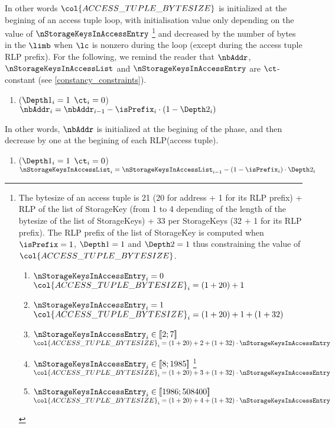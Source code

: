 In other words $\col{ACCESS\_TUPLE\_BYTESIZE}$ is initialized at the begining of an access tuple loop, with initialisation value only depending on the value of $\nStorageKeysInAccessEntry$ 
\footnote{The bytesize of an access tuple is 21 (20 for address + 1 for its RLP prefix) + RLP of the list of StorageKey (from 1 to 4 depending of the length of the bytesize of the list of StorageKeys) + 33 per StorageKeys (32 + 1 for its RLP prefix). The RLP prefix of the list of StorageKey is computed when $\isPrefix = 1$, $\Depth 1 =1$ and $\Depth 2 = 1$ thus constraining the value of $\col{ACCESS\_TUPLE\_BYTESIZE}$.
\begin{enumerate}
	\item \If $\nStorageKeysInAccessEntry_{i}=0$ \Then $\col{ACCESS\_TUPLE\_BYTESIZE}_{i}=(1+20) + 1$
	\item \If $\nStorageKeysInAccessEntry_{i}=1$ \Then $\col{ACCESS\_TUPLE\_BYTESIZE}_{i}=(1+20) + 1 + (1+32)$
	\item \If $\nStorageKeysInAccessEntry_{i} \in [\![ 2 ; 7 ]\!] $ \Then $\col{ACCESS\_TUPLE\_BYTESIZE}_{i}= (1+20) + 2 + (1+32) \cdot \nStorageKeysInAccessEntry$
	\item \If $\nStorageKeysInAccessEntry_{i} \in [\![ 8 ; 1985  ]\!]$ \footnote{In this case the bytesize of $\nStorageKeysInAccessEntry$ RLP(StorageKey) is a two bytes integer.} \Then $\col{ACCESS\_TUPLE\_BYTESIZE}_{i}= (1+20) + 3 + (1+32) \cdot \nStorageKeysInAccessEntry$
	\item \If $\nStorageKeysInAccessEntry_{i} \in [\![ 1986 ; 508400]\!]$ \Then $\col{ACCESS\_TUPLE\_BYTESIZE}_{i}= (1+20) + 4 + (1+32) \cdot \nStorageKeysInAccessEntry$
\end{enumerate}
}
and decreased by the number of bytes in the $\limb$ when $\lc$ is nonzero during the loop (except during the access tuple RLP prefix).
\newline
For the following, we remind the reader that $\nbAddr$, $\nStorageKeysInAccessList$ and $\nStorageKeysInAccessEntry$ are $\ct$-constant (see \ref{constancy_constraints}).
\begin{enumerate}[resume]
	\item \If ($\Depth1_{i}=1$ \et $\ct_{i}=0$) \Then $\nbAddr_{i} = \nbAddr_{i-1} - \isPrefix_{i} \cdot (1 - \Depth2_{i})$
\end{enumerate}
In other words, $\nbAddr$ is initialized at the begining of the phase, and then decrease by one at the begining of each RLP(access tuple).
\begin{enumerate}[resume]    
	\item \If ($\Depth1_{i}=1$ \et $\ct_{i}=0$) \Then $\nStorageKeysInAccessList_{i} = \nStorageKeysInAccessList_{i-1} - (1- \isPrefix_{i}) \cdot \Depth2_{i}$
\end{enumerate}
